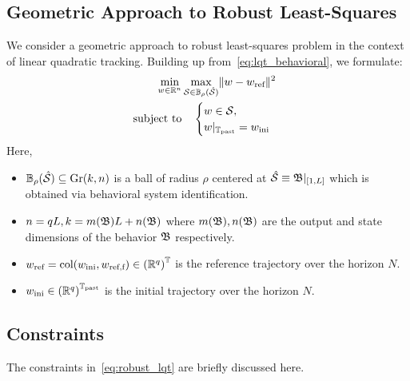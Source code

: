 \subsection{Geometric Approach to Robust Least-Squares}
We consider a geometric approach to robust least-squares problem in the context of linear quadratic tracking. Building up from~\eqref{eq:lqt_behavioral}, we formulate:
\begin{equation}\label{eq:robust_lqt}
    \begin{split}
    \min_{w \in \mathbb{R}^n} & \max_{\mathcal{S} \in \mathbb{B}_{\rho}(\hat{\mathcal{S}})} \lVert w - w_{\textrm{ref}} \rVert^2 \\
    \text{subject to} & \quad \begin{cases} w \in \mathcal{S},\\
          w|_{\mathbb{T}_{\textrm{past}}} = w_{\textrm{ini}} \end{cases}
    \end{split}
\end{equation}
Here, 
\begin{itemize}
    \item $\mathbb{B}_{\rho}(\hat{\mathcal{S}}) \subseteq \text{Gr}(k,n)$ is a ball of radius $\rho$ centered at $\hat{\mathcal{S}} \equiv \mathfrak{B}|_{[1,L]}$ which is obtained via behavioral system identification.
    \item $n = qL, k = m(\mathfrak{B})L+n(\mathfrak{B})$ where $m(\mathfrak{B}), n(\mathfrak{B})$ are the output and state dimensions of the behavior $\mathfrak{B}$ respectively.
    \item $w_{\textrm{ref}} = \textrm{col}(w_{\textrm{ini}}, w_{\textrm{ref,f}}) \in {(\mathbb{R}^q)}^{\mathbb{T}}$ is the reference trajectory over the horizon $N$.
    \item $w_{\textrm{ini}} \in {(\mathbb{R}^q)}^{\mathbb{T}_{\textrm{past}}}$ is the initial trajectory over the horizon $N$.
\end{itemize}

\subsection{Constraints}
The constraints in~\eqref{eq:robust_lqt} are briefly discussed here.

